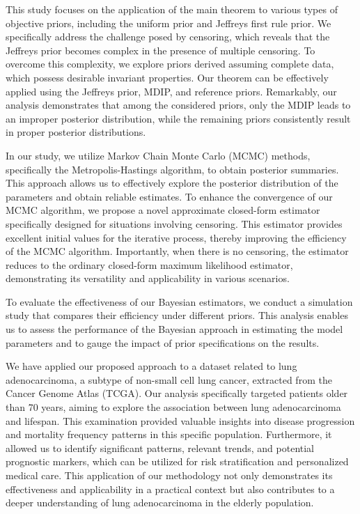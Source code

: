 \documentclass[]{interact}
\theoremstyle{plain}%
\theoremstyle{definition}
\theoremstyle{remark}
\begin{document}
This study focuses on the application of the main theorem to various types of objective priors, including the uniform prior and Jeffreys first rule prior. We specifically address the challenge posed by censoring, which reveals that the Jeffreys prior becomes complex in the presence of multiple censoring. To overcome this complexity, we explore priors derived assuming complete data, which possess desirable invariant properties. Our theorem can be effectively applied using the Jeffreys prior, MDIP, and reference priors. Remarkably, our analysis demonstrates that among the considered priors, only the MDIP leads to an improper posterior distribution, while the remaining priors consistently result in proper posterior distributions.

In our study, we utilize Markov Chain Monte Carlo (MCMC) methods, specifically the Metropolis-Hastings algorithm, to obtain posterior summaries. This approach allows us to effectively explore the posterior distribution of the parameters and obtain reliable estimates. To enhance the convergence of our MCMC algorithm, we propose a novel approximate closed-form estimator specifically designed for situations involving censoring. This estimator provides excellent initial values for the iterative process, thereby improving the efficiency of the MCMC algorithm. Importantly, when there is no censoring, the estimator reduces to the ordinary closed-form maximum likelihood estimator, demonstrating its versatility and applicability in various scenarios.


To evaluate the effectiveness of our Bayesian estimators, we conduct a simulation study that compares their efficiency under different priors. This analysis enables us to assess the performance of the Bayesian approach in estimating the model parameters and to gauge the impact of prior specifications on the results. 


We have applied our proposed approach to a dataset related to lung adenocarcinoma, a subtype of non-small cell lung cancer, extracted from the Cancer Genome Atlas (TCGA). Our analysis specifically targeted patients older than 70 years, aiming to explore the association between lung adenocarcinoma and lifespan. This examination provided valuable insights into disease progression and mortality frequency patterns in this specific population. Furthermore, it allowed us to identify significant patterns, relevant trends, and potential prognostic markers, which can be utilized for risk stratification and personalized medical care. This application of our methodology not only demonstrates its effectiveness and applicability in a practical context but also contributes to a deeper understanding of lung adenocarcinoma in the elderly population.
\end{document}
